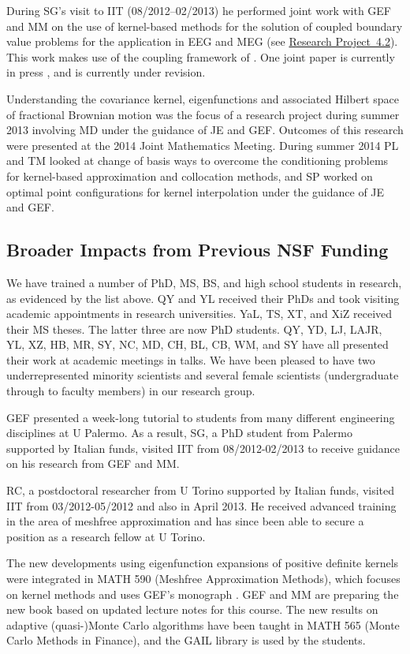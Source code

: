 \documentclass[11pt]{NSFamsart}
\newcommand{\refprobdb}{\hyperref[SectMEEG]{Research Project~4.2}\xspace}
\begin{document}
During SG's visit to IIT (08/2012--02/2013) he performed joint work with GEF and MM on the use of kernel-based methods for the solution of coupled boundary value problems for the application in EEG and MEG (see \refprobdb). This work makes use of the coupling framework of \cite{McCF14}. One joint paper is currently in press \citep{AFFGM15}, and \citep{AFFGM13} is currently under revision.

Understanding the covariance kernel, eigenfunctions and associated Hilbert space of fractional Brownian motion was the focus of a research project during summer 2013 involving MD under the guidance of JE and GEF. Outcomes of this research were presented at the 2014 Joint Mathematics Meeting. During summer 2014 PL and TM looked at change of basis ways to overcome
the conditioning problems for kernel-based approximation
and collocation methods, and SP worked on optimal point configurations for kernel
interpolation under the guidance of JE and GEF.

\subsection{Broader Impacts from Previous NSF Funding}

We have trained a number of PhD, MS, BS, and high school students in research, as evidenced by the list above.  QY and YL received their PhDs and took visiting academic appointments in research universities. YaL, TS, XT, and XiZ received their MS theses. The latter three are now PhD students.  QY, YD, LJ, LAJR, YL, XZ, HB, MR, SY, NC, MD, CH, BL, CB, WM, and SY have all presented their work at academic meetings in talks.  We have been pleased to have two underrepresented minority scientists and several female scientists (undergraduate through to faculty members) in our research group.

GEF presented a week-long tutorial to students from many different engineering disciplines at U Palermo. As a result, SG, a PhD student from Palermo supported by Italian funds, visited IIT from 08/2012-02/2013 to receive guidance on his research from GEF and MM.

RC, a postdoctoral researcher from U Torino supported by Italian funds, visited IIT from 03/2012-05/2012 and also in April 2013. He received advanced training in the area of meshfree approximation and has since been able to secure a position as a research fellow at U Torino.

The new developments using eigenfunction expansions of positive definite kernels were integrated in MATH 590 (Meshfree Approximation Methods), which focuses on kernel methods and uses GEF's monograph \citep{Fas07a}. GEF and MM are preparing the new book \citep{FMcC15} based on updated lecture notes for this course.  The new results on adaptive (quasi-)Monte Carlo algorithms have been taught in MATH 565 (Monte Carlo Methods in Finance), and the GAIL library is used by the students.
\end{document}
